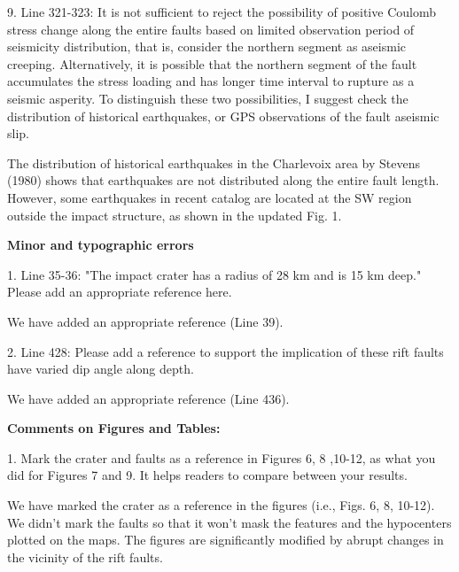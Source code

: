 \documentclass[12pt]{article}
\begin{document}
\begin{response}{9. Line 321-323: It is not sufficient to reject the possibility of positive Coulomb stress change along the entire faults based on limited observation period of seismicity distribution, that is, consider the northern segment as aseismic creeping. Alternatively, it is possible that the northern segment of the fault accumulates the stress loading and has longer time interval to rupture as a seismic asperity. To distinguish these two possibilities, I suggest check the distribution of historical earthquakes, or GPS observations of the fault aseismic slip.}

  The distribution of historical earthquakes in the Charlevoix area by Stevens (1980) shows that earthquakes are not distributed along the entire fault length. However, some earthquakes  in recent catalog are located at the SW region outside the impact structure, as shown in the updated Fig. 1.
  

\end{response}

\textbf{Minor and typographic errors} 

\begin{response}{1. Line 35-36: "The impact crater has a radius of 28 km and is 15 km deep." Please add an appropriate reference here.}

  We have added an appropriate reference (Line 39).
\end{response}

\begin{response}{2. Line 428: Please add a reference to support the implication of these rift faults have varied dip angle along depth.}

  We have added an appropriate reference (Line 436).
\end{response}

\textbf{Comments on Figures and Tables:}

\begin{response}{1. Mark the crater and faults as a reference in Figures 6, 8 ,10-12, as what you did for Figures 7 and 9. It helps readers to compare between your results.}

  We have marked the crater as a reference in the figures (i.e., Figs. 6, 8, 10-12). We didn't mark the faults so that it won't mask the features and the hypocenters plotted on the maps. The figures are significantly modified by abrupt changes in the vicinity of the rift faults.
\end{response}
\end{document}
